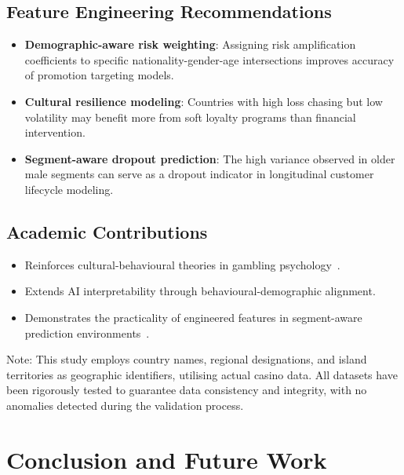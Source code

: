 \documentclass[12pt,a4paper]{report}
\begin{document}
\subsection{Feature Engineering Recommendations}

\begin{itemize}
    \item \textbf{Demographic-aware risk weighting}: Assigning risk amplification coefficients to specific nationality-gender-age intersections improves accuracy of promotion targeting models.
    \item \textbf{Cultural resilience modeling}: Countries with high loss chasing but low volatility may benefit more from soft loyalty programs than financial intervention.
    \item \textbf{Segment-aware dropout prediction}: The high variance observed in older male segments can serve as a dropout indicator in longitudinal customer lifecycle modeling.
\end{itemize}

\subsection{Academic Contributions}

\begin{itemize}
    \item Reinforces cultural-behavioural theories in gambling psychology~\citep{gambling_behavior_book}.
    \item Extends AI interpretability through behavioural-demographic alignment.
    \item Demonstrates the practicality of engineered features in segment-aware prediction environments~\citep{rf_original,ghaharian2022c}.
\end{itemize}

Note: This study employs country names, regional designations, and island territories as geographic identifiers, utilising actual casino data.  All datasets have been rigorously tested to guarantee data consistency and integrity, with no anomalies detected during the validation process.




\section{Conclusion and Future Work}
\label{sec:conclusion}
\end{document}
